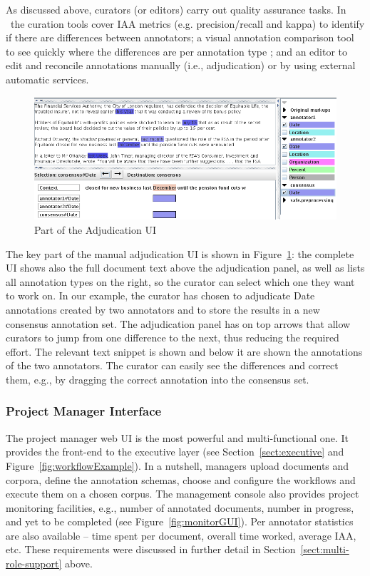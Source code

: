 As discussed above, curators (or editors) carry out quality assurance tasks. In \teamware\ the curation tools cover IAA metrics (e.g. precision/recall and kappa) to identify if there are differences between annotators; a visual annotation comparison tool to see quickly where the differences are per annotation type \cite{Cun02b}; and an editor to edit and reconcile annotations manually (i.e., adjudication) or by using external automatic services. 

\begin{figure}[t!]
\begin{center}
\includegraphics[scale=0.6]{teamware-curator-adjudication.png}
\caption{Part of the Adjudication UI} \label{fig:curatorGUI}
\end{center}
\end{figure}

The key part of the manual adjudication UI is shown in Figure~\ref{fig:curatorGUI}: the complete UI shows also the full document text above the adjudication panel, as well as lists all annotation types on the right, so the curator can select which one they want to work on. In our example, the curator has chosen to adjudicate Date annotations created by two annotators and to store the results in a new consensus annotation set. The adjudication panel has on top arrows that allow curators to jump from one difference to the next, thus reducing the required effort. The relevant text snippet is shown and below it are shown the annotations of the two annotators. The curator can easily see the differences and correct them, e.g., by dragging the correct annotation into the consensus set.  

\subsubsection{Project Manager Interface}

The project manager web UI is the most powerful and multi-functional one. It provides the front-end to the executive layer (see Section~\ref{sect:executive} and Figure~\ref{fig:workflowExample}). In a nutshell, managers upload documents and corpora, define the annotation schemas, choose and configure the workflows and execute them on a chosen corpus. The management console also provides project monitoring facilities, e.g., number of annotated documents, number in progress, and yet to be completed (see Figure~\ref{fig:monitorGUI}). Per annotator statistics are also available -- time spent per document, overall time worked, average IAA, etc. These requirements were discussed in further detail in Section~\ref{sect:multi-role-support} above.

